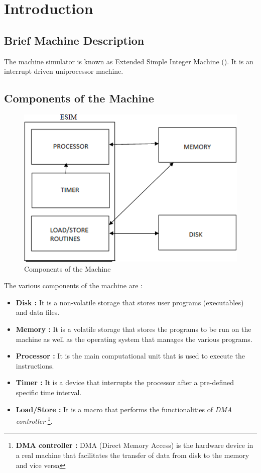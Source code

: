 \chapter{Introduction }
\label{chp:intro}

\section{Brief Machine Description}
The machine simulator is known as Extended Simple Integer Machine (\ESIM).
It is an interrupt driven uniprocessor machine.

\section{Components of the Machine}
\begin{figure}[ht!]
	\centering
	\includegraphics[scale=0.5]{pics/components_machine}
	\caption{Components of the Machine}
	\label{fig:components}
\end{figure}

The various components of the machine are :
\begin{itemize}
	\item \textbf{Disk :} It is a non-volatile storage that stores user programs (executables) and data files. 
	\item \textbf{Memory :} It is a volatile storage that stores the programs to be run on the machine as well as the operating system that manages the various programs. 
	\item \textbf{Processor :} It is the main computational unit that is used to execute the instructions. 
	\item \textbf{Timer :} It is a device that interrupts the processor after a pre-defined specific time interval. 
	\item \textbf{Load/Store :} It is a macro that performs the functionalities of \emph{DMA controller} 
	\footnote{\textbf{DMA controller :} DMA (Direct Memory Access) is the hardware device in a real machine that facilitates the transfer of data from disk to the memory and vice versa}.
\end{itemize}

